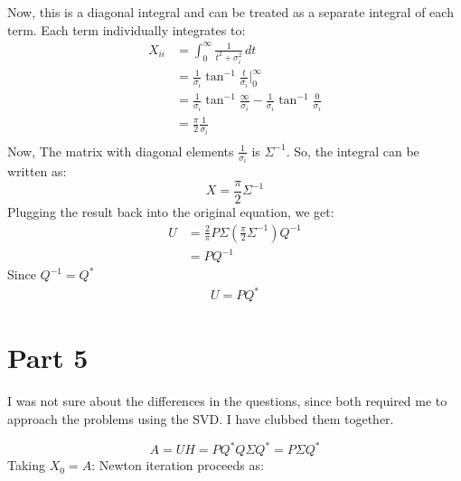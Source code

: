 \documentclass{article}
\begin{document}
Now, this is a diagonal integral and can be treated as a separate integral of each term. Each term individually integrates to:
\begin{align*}
    X_{ii} &=  \int_{0}^{\infty} \frac{1}{t^2 + \sigma_{i}^2} \,dt\\
    &=  \frac{1}{\sigma_{i}}\tan^{-1}{\frac{t}{\sigma_{i}}}\bigg\rvert_{0}^{\infty}\\
    &=  \frac{1}{\sigma_{i}}\tan^{-1}{\frac{\infty}{\sigma_{i}}} - \frac{1}{\sigma_{i}}\tan^{-1}{\frac{0}{\sigma_{i}}}\\
    &=  \frac{\pi}{2} \frac{1}{\sigma_{i}}\\
\end{align*}
Now, The matrix with diagonal elements $\frac{1}{\sigma_{i}}$ is $\Sigma^{-1}$. So, the integral can be written as:
\[ X = \frac{\pi}{2} \Sigma^{-1}\]
Plugging the result back into the original equation, we get:
\begin{align*}
    U &= \frac{2}{\pi} P \Sigma (\frac{\pi}{2} \Sigma^{-1}) Q^{-1}\\
     &= PQ^{-1}
\end{align*}
Since $Q^{-1} = Q^*$
\begin{align*}
    U = PQ^*
\end{align*}


\newpage
\section{Part 5}
I was not sure about the differences in the questions, since both required me to approach the problems using the SVD. I have clubbed them together.

\[A = U H = P Q^* Q \Sigma Q^* = P\Sigma Q^*\]
Taking $X_0 = A$:
Newton iteration proceeds as:
\end{document}
